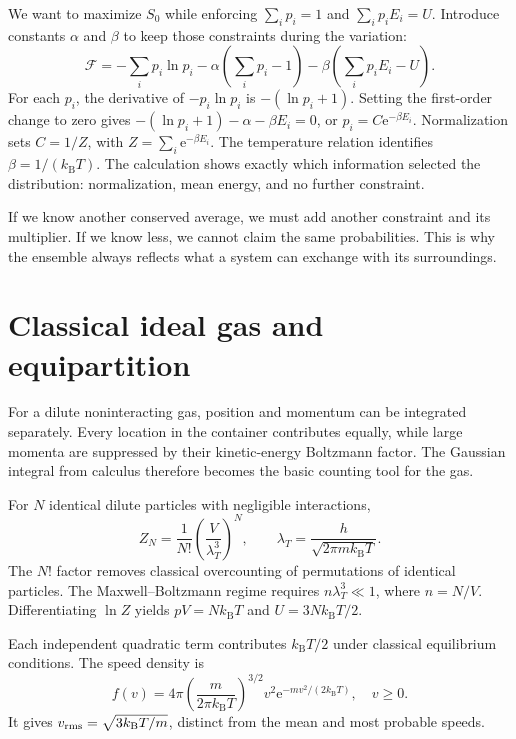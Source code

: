 \documentclass[11pt,oneside]{book}
\newcommand{\ee}{\mathrm{e}}
\newcommand{\kb}{k_{\mathrm B}}
\theoremstyle{reviewstyle}
\begin{document}
We want to maximize $S_0$ while enforcing $\sum_i p_i=1$ and $\sum_i p_iE_i=U$. Introduce constants $\alpha$ and $\beta$ to keep those constraints during the variation:
\begin{equation}
\mathcal F=-\sum_i p_i\ln p_i
-\alpha\left(\sum_i p_i-1\right)
-\beta\left(\sum_i p_iE_i-U\right).
\end{equation}
For each $p_i$, the derivative of $-p_i\ln p_i$ is $-(\ln p_i+1)$. Setting the first-order change to zero gives $-(\ln p_i+1)-\alpha-\beta E_i=0$, or $p_i=C\ee^{-\beta E_i}$. Normalization sets $C=1/Z$, with $Z=\sum_i\ee^{-\beta E_i}$. The temperature relation identifies $\beta=1/(\kb T)$. The calculation shows exactly which information selected the distribution: normalization, mean energy, and no further constraint.

If we know another conserved average, we must add another constraint and its multiplier. If we know less, we cannot claim the same probabilities. This is why the ensemble always reflects what a system can exchange with its surroundings.

\section{Classical ideal gas and equipartition}
For a dilute noninteracting gas, position and momentum can be integrated separately. Every location in the container contributes equally, while large momenta are suppressed by their kinetic-energy Boltzmann factor. The Gaussian integral from calculus therefore becomes the basic counting tool for the gas.

For $N$ identical dilute particles with negligible interactions,
\begin{equation}
Z_N=\frac1{N!}\left(\frac{V}{\lambda_T^3}\right)^N,\qquad
\lambda_T=\frac{h}{\sqrt{2\pi m\kb T}}.
\end{equation}
The $N!$ factor removes classical overcounting of permutations of identical particles. The Maxwell--Boltzmann regime requires $n\lambda_T^3\ll1$, where $n=N/V$. Differentiating $\ln Z$ yields $pV=N\kb T$ and $U=3N\kb T/2$.

Each independent quadratic term contributes $\kb T/2$ under classical equilibrium conditions. The speed density is
\begin{equation}
f(v)=4\pi\left(\frac{m}{2\pi\kb T}\right)^{3/2}v^2\ee^{-mv^2/(2\kb T)},\quad v\geq0.
\end{equation}
It gives $v_{\rm rms}=\sqrt{3\kb T/m}$, distinct from the mean and most probable speeds.
\end{document}
